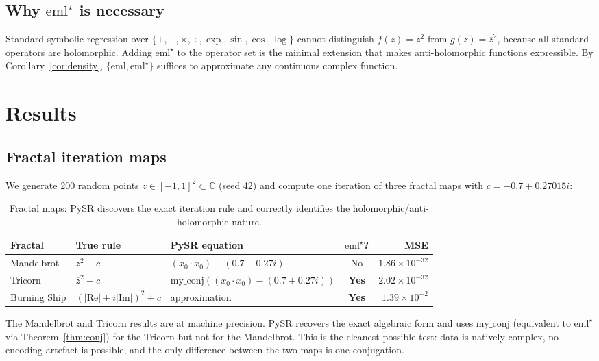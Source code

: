 \documentclass[12pt,a4paper]{article}
\newcommand{\emlstar}{\mathrm{eml}^{\star}}
\newcommand{\eml}{\mathrm{eml}}
\newcommand{\conj}[1]{\overline{#1}}
\begin{document}
\subsection{Why $\emlstar$ is necessary}

Standard symbolic regression over $\{+,-,\times,\div,\exp,\sin,\cos,\log\}$
cannot distinguish $f(z) = z^2$ from $g(z) = \conj{z}^2$, because
all standard operators are holomorphic.
Adding $\emlstar$ to the operator set is the minimal extension that
makes anti-holomorphic functions expressible.
By Corollary~\ref{cor:density}, $\{\eml, \emlstar\}$ suffices
to approximate any continuous complex function.


\section{Results}
\label{sec:results}

\subsection{Fractal iteration maps}
\label{sec:fractals}

We generate 200 random points $z \in [-1,1]^2 \subset \mathbb{C}$
(seed 42) and compute one iteration of three fractal maps with
$c = -0.7 + 0.27015i$:

\begin{table}[h]
\centering
\caption{Fractal maps: PySR discovers the exact iteration rule
and correctly identifies the holomorphic/anti-holomorphic nature.}
\label{tab:fractals}
\begin{tabular}{lllcr}
\toprule
Fractal & True rule & PySR equation & $\emlstar$? & MSE \\
\midrule
Mandelbrot & $z^2 + c$ & $(x_0 \cdot x_0) - (0.7 - 0.27i)$ & No & $1.86 \times 10^{-32}$ \\
Tricorn & $\conj{z}^2 + c$ & $\mathrm{my\_conj}((x_0 \cdot x_0) - (0.7 + 0.27i))$ & \textbf{Yes} & $2.02 \times 10^{-32}$ \\
Burning Ship & $(|\mathrm{Re}|+i|\mathrm{Im}|)^2+c$ & approximation & \textbf{Yes} & $1.39 \times 10^{-2}$ \\
\bottomrule
\end{tabular}
\end{table}

The Mandelbrot and Tricorn results are at machine precision.
PySR recovers the exact algebraic form and uses $\mathrm{my\_conj}$
(equivalent to $\emlstar$ via Theorem~\ref{thm:conj}) for the Tricorn
but not for the Mandelbrot.
This is the cleanest possible test: data is natively complex,
no encoding artefact is possible, and the only difference between
the two maps is one conjugation.
\end{document}
